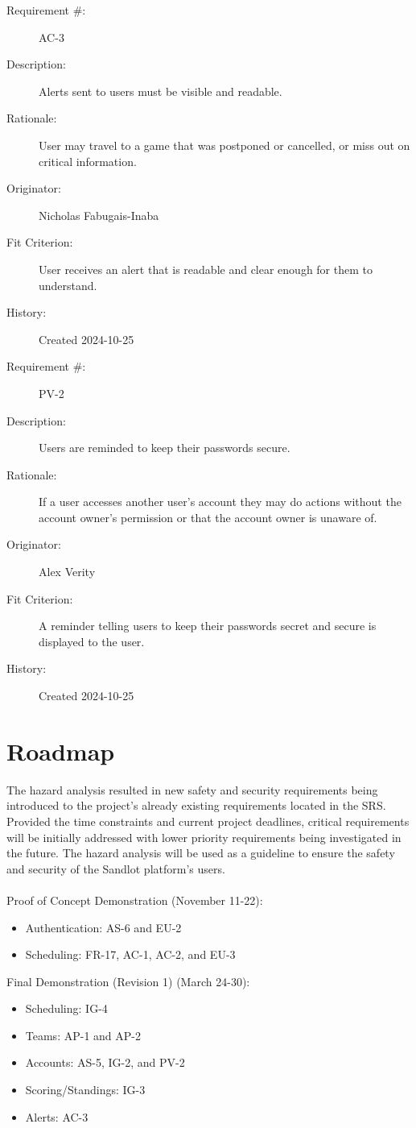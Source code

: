 \documentclass{article}
\newenvironment{myreq}[1]{%
\setlist[description]{font=\normalfont\color{darkgray}}%
\begin{tcolorbox}[colframe=black,colback=white, sharp corners, boxrule=1pt]%
\bfseries\color{blue}%
\begin{description}#1}%
{\end{description}\end{tcolorbox}}
\newcommand{\twoinline}[2]{\begin{multicols}{2}#1 #2\end{multicols}}
\newcommand{\reqno}{\item[Requirement \#:]}
\newcommand{\reqdesc}{\item[Description:]}
\newcommand{\reqrat}{\item[Rationale:]}
\newcommand{\reqorig}{\item[Originator:]}
\newcommand{\reqfit}{\item[Fit Criterion:]}
\newcommand{\reqsatis}{\item[Customer Satisfaction:]}
\newcommand{\reqdissat}{\item[Customer Dissatisfaction:]}
\newcommand{\reqhist}{\item[History:]}
\begin{document}
\begin{myreq}
  \reqno AC-3
  \reqdesc Alerts sent to users must be visible and readable.
  \reqrat User may travel to a game that was postponed or cancelled, or miss
  out on critical information.
  \reqorig Nicholas Fabugais-Inaba
  \reqfit User receives an alert that is readable and clear enough for them
  to understand.
  \twoinline
    {\reqsatis 3}
    {\reqdissat 3}
  \reqhist Created 2024-10-25
\end{myreq}

\begin{myreq}
  \reqno PV-2
  \reqdesc Users are reminded to keep their passwords secure.
  \reqrat If a user accesses another user's account they may do actions
  without the account owner's permission or that the account owner is unaware
  of.
  \reqorig Alex Verity
  \reqfit A reminder telling users to keep their passwords secret and secure
  is displayed to the user.
  \twoinline
    {\reqsatis 1}
    {\reqdissat 1}
  \reqhist Created 2024-10-25
\end{myreq}

\section{Roadmap}

The hazard analysis resulted in new safety and security requirements being
introduced to the project's already existing requirements located in the
SRS. Provided the time constraints and current project deadlines, critical
requirements will be initially addressed with lower priority requirements
being investigated in the future. The hazard analysis will be used as a guideline
to ensure the safety and security of the Sandlot platform's users.\\\\

Proof of Concept Demonstration (November 11-22):
\begin{itemize}
  \item Authentication: AS-6 and EU-2
  \item Scheduling: FR-17, AC-1, AC-2, and EU-3
\end{itemize}

Final Demonstration (Revision 1) (March 24-30):
\begin{itemize}
  \item Scheduling: IG-4
  \item Teams: AP-1 and AP-2
  \item Accounts: AS-5, IG-2, and PV-2
  \item Scoring/Standings: IG-3
  \item Alerts: AC-3
\end{itemize}
\end{document}
